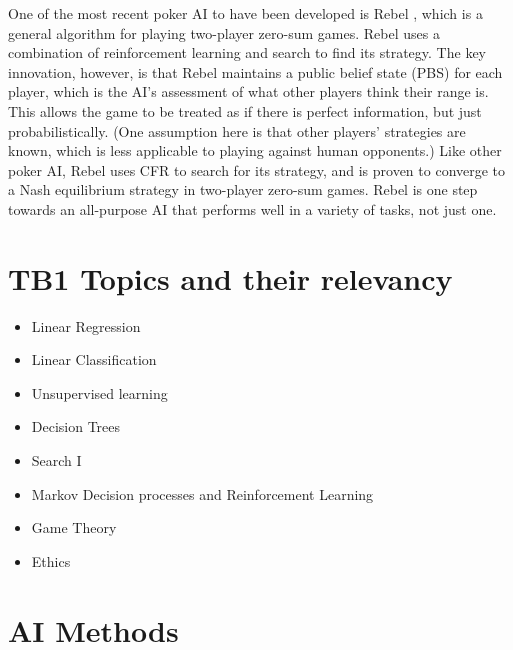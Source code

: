 \documentclass{article}
\begin{document}
\begin{multicols*}{2}
\newline
One of the most recent poker AI to have been developed is Rebel \cite{Rebel1} \cite{Rebel2}, which is a general algorithm for playing two-player zero-sum games. Rebel uses a combination of reinforcement learning and search to find its strategy. The key innovation, however, is that Rebel maintains a public belief state (PBS) for each player, which is the AI’s assessment of what other players think their range is. This allows the game to be treated as if there is perfect information, but just probabilistically. (One assumption here is that other players’ strategies are known, which is less applicable to playing against human opponents.) Like other poker AI, Rebel uses CFR to search for its strategy, and is proven to converge to a Nash equilibrium strategy in two-player zero-sum games. Rebel is one step towards an all-purpose AI that performs well in a variety of tasks, not just one.
\section{TB1 Topics and their relevancy}
\begin{itemize}
    \item Linear Regression
    \item Linear Classification
    \item Unsupervised learning
    \item Decision Trees
    \item Search I
    \item Markov Decision processes and Reinforcement Learning
    \item Game Theory
    \item Ethics
\end{itemize}
\section{AI Methods}



\end{multicols*}
\end{document}
